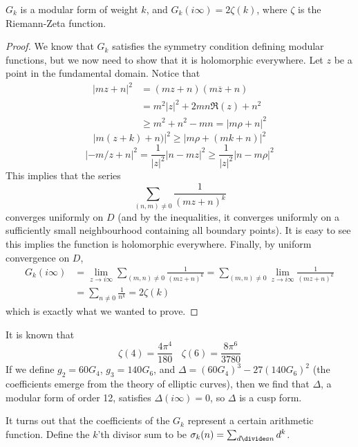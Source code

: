 \begin{theorem}
    $G_k$ is a modular form of weight $k$, and $G_k(i \infty) = 2 \zeta(k)$, where $\zeta$ is the Riemann-Zeta function.
\end{theorem}
\begin{proof}
    We know that $G_k$ satisfies the symmetry condition defining modular functions, but we now need to show that it is holomorphic everywhere. Let $z$ be a point in the fundamental domain. Notice that
    \begin{align*}
        |mz + n|^2 &= (mz + n)(m \overline{z} + n)\\
        &= m^2 |z|^2 + 2mn \Re(z) + n^2\\
        &\geq m^2 + n^2 - mn = |m \rho + n|^2
    \end{align*}
    \[ |m(z + k) + n)|^2 \geq |m \rho + (mk+n)|^2 \]
    \[ |-m/z + n|^2 = \frac{1}{|z|^2} |n - mz|^2 \geq \frac{1}{|z|^2} |n - m \rho|^2 \]
    This implies that the series
    \[ \sum_{(n,m) \neq 0} \frac{1}{(mz + n)^{k}} \]
    converges uniformly on $D$ (and by the inequalities, it converges uniformly on a sufficiently small neighbourhood containing all boundary points). It is easy to see this implies the function is holomorphic everywhere. Finally, by uniform convergence on $D$,
    \begin{align*}
        G_k(i \infty) &= \lim_{z \to i \infty} \sum_{(m,n) \neq 0} \frac{1}{(mz + n)^{k}} = \sum_{(m,n) \neq 0} \lim_{z \to i \infty} \frac{1}{(mz + n)^{k}}\\
        &= \sum_{n \neq 0} \frac{1}{n^{k}} = 2 \zeta(k)
    \end{align*}
    which is exactly what we wanted to prove.
\end{proof}

\begin{example}
    It is known that
    \[ \zeta(4) = \frac{4 \pi^4}{180}\ \ \ \ \zeta(6) = \frac{8 \pi^6}{3780} \]
    If we define $g_2 = 60 G_4$, $g_3 = 140 G_6$, and $\Delta = (60 G_4)^3 - 27 (140 G_6)^2$ (the coefficients emerge from the theory of elliptic curves), then we find that $\Delta$, a modular form of order 12, satisfies $\Delta(i \infty) = 0$, so $\Delta$ is a cusp form.
\end{example}

It turns out that the coefficients of the $G_k$ represent a certain arithmetic function. Define the $k$'th divisor sum to be $\sigma_k(n) = \sum_{d \divides n} d^k$.

